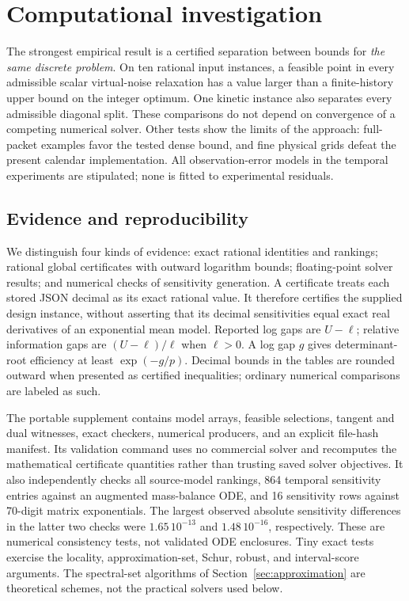 \section{Computational investigation}\label{sec:computation}

The strongest empirical result is a certified separation between bounds for
\emph{the same discrete problem}. On ten rational input instances, a feasible
point in every admissible scalar virtual-noise relaxation has a value larger
than a finite-history upper bound on the integer optimum. One kinetic instance
also separates every admissible diagonal split. These comparisons do not
depend on convergence of a competing numerical solver. Other tests show the
limits of the approach: full-packet examples favor the tested dense bound,
and fine physical grids defeat the present calendar implementation. All
observation-error models in the temporal experiments are stipulated; none is
fitted to experimental residuals.

\subsection{Evidence and reproducibility}\label{subsec:computational-evidence}

We distinguish four kinds of evidence: exact rational identities and rankings;
rational global certificates with outward logarithm bounds; floating-point
solver results; and numerical checks of sensitivity generation. A certificate
treats each stored JSON decimal as its exact rational value. It therefore
certifies the supplied design instance, without asserting that its decimal
sensitivities equal exact real derivatives of an exponential mean model.
Reported log gaps are $U-\ell$; relative information gaps are
$(U-\ell)/\ell$ when $\ell>0$. A log gap $g$ gives determinant-root efficiency
at least $\exp(-g/p)$. Decimal bounds in the tables are rounded outward when
presented as certified inequalities; ordinary numerical comparisons are labeled
as such.

The portable supplement contains model arrays, feasible selections, tangent
and dual witnesses, exact checkers, numerical producers, and an explicit
file-hash manifest. Its validation command uses no commercial solver and
recomputes the mathematical certificate quantities rather than trusting saved
solver objectives. It also independently checks all source-model rankings,
864 temporal sensitivity entries against an augmented mass-balance ODE, and
16 sensitivity rows against 70-digit matrix exponentials. The largest observed
absolute sensitivity differences in the latter two checks were
$1.65\,10^{-13}$ and $1.48\,10^{-16}$, respectively. These are numerical
consistency tests, not validated ODE enclosures. Tiny exact tests exercise the
locality, approximation-set, Schur, robust, and interval-score arguments.
The spectral-set algorithms of Section~\ref{sec:approximation} are theoretical
schemes, not the practical solvers used below.

